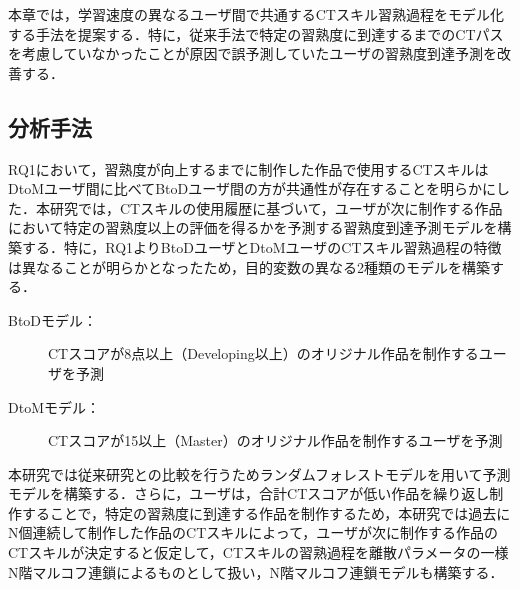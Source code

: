 \documentclass[submit]{ipsj}
\newcommand{\todo}[1]{\colorbox{yellow}{{\bf TODO}:}{\color{red} {\textbf{[#1]}}}}
\begin{document}
本章では，学習速度の異なるユーザ間で共通するCTスキル習熟過程をモデル化する手法を提案する．特に，従来手法で特定の習熟度に到達するまでのCTパスを考慮していなかったことが原因で誤予測していたユーザの習熟度到達予測を改善する．

\subsection{分析手法}

RQ1において，習熟度が向上するまでに制作した作品で使用するCTスキルはDtoMユーザ間に比べてBtoDユーザ間の方が共通性が存在することを明らかにした．本研究では，CTスキルの使用履歴に基づいて，ユーザが次に制作する作品において特定の習熟度以上の評価を得るかを予測する習熟度到達予測モデルを構築する．特に，RQ1よりBtoDユーザとDtoMユーザのCTスキル習熟過程の特徴は異なることが明らかとなったため，目的変数の異なる2種類のモデルを構築する．
\begin{description}
\item [BtoDモデル：]CTスコアが8点以上（Developing以上）のオリジナル作品を制作するユーザを予測
\item [DtoMモデル：]CTスコアが15以上（Master）のオリジナル作品を制作するユーザを予測
\end{description}



本研究では従来研究との比較を行うためランダムフォレストモデルを用いて予測モデルを構築する．さらに，ユーザは，合計CTスコアが低い作品を繰り返し制作することで，特定の習熟度に到達する作品を制作するため，本研究では過去にN個連続して制作した作品のCTスキルによって，ユーザが次に制作する作品のCTスキルが決定すると仮定して，CTスキルの習熟過程を離散パラメータの一様N階マルコフ連鎖によるものとして扱い，N階マルコフ連鎖モデルも構築する．

\end{document}
